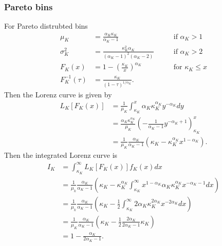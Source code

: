 \documentclass[12pt]{article}
\begin{document}
\subsubsection{Pareto bins}
For Pareto distrubted bins
\begin{align*}
  \mu_K & = \frac{\alpha_K\kappa_K}{\alpha_K - 1} &&& \mbox{ if } \alpha_K > 1\\
  \sigma_K^2 &= \frac{\kappa_K^2\alpha_K}{(\alpha_K-1)^2(\alpha_K-2)} &&& \mbox{ if } \alpha_K > 2\\
  F_K(x) &= 1 - \left(\frac{\kappa_K}{x}\right)^{\alpha_K} &&& \mbox{ for } \kappa_K \leq x \\
  F^{-1}_K(\tau) & = \frac{\kappa_K}{(1 - \tau)^{1/\alpha_K}}. &&&
\end{align*}
Then the Lorenz curve is given by
\begin{align*}
  L_K[F_K(x)] & = \frac{1}{\mu_K}\int_{\kappa_K}^{x} \alpha_K\kappa_K^{\alpha_K} y^{-\alpha_K} dy \\
              & = \frac{\alpha_K\kappa_K^{\alpha_K}}{\mu_K}\left(-\frac{1}{\alpha_K - 1}y^{-\alpha_K + 1}\right)_{\kappa_K}^{x} \\
              & = \frac{1}{\mu_K}\frac{\alpha_K}{\alpha_K - 1}\left(\kappa_K - \kappa_K^{\alpha_K}x^{1 - \alpha_K}\right).
\end{align*}
Then the integrated Lorenz curve is
\begin{align*}
  I_K & = \int_{\kappa_K}^{\infty}L_K[F_K(x)]f_K(x) dx\\
      & = \frac{1}{\mu_k}\frac{\alpha_K}{\alpha_K - 1}\left(\kappa_K - \kappa_{K}^{\alpha_K}\int_{\kappa_K}^{\infty}x^{1 - \alpha_K}\alpha_K\kappa_K^{\alpha_K}x^{-\alpha_K - 1} dx\right) \\
        & = \frac{1}{\mu_k}\frac{\alpha_K}{\alpha_K - 1}\left(\kappa_K - \frac{1}{2}\int_{\kappa_K}^{\infty}2\alpha_K\kappa_K^{2\alpha_K}x^{-2\alpha_K} dx\right) \\
      & = \frac{1}{\mu_K}\frac{\alpha_K}{\alpha_K - 1}\left(\kappa_K - \frac{1}{2}\frac{2\alpha_K}{2\alpha_K - 1}\kappa_K\right)\\
      & = 1 - \frac{\alpha_K}{2\alpha_K - 1}.
\end{align*}
\end{document}
